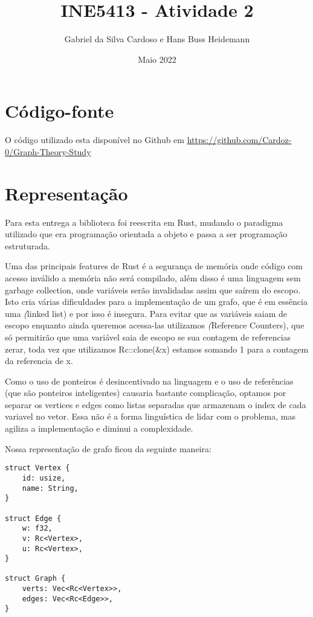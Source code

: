 \documentclass{article}
\title{INE5413 - Atividade 2}
\author{Gabriel da Silva Cardoso e Hans Buss Heidemann}
\date{Maio 2022}
\begin{document}
\maketitle

\section{Código-fonte}

O código utilizado esta disponível no Github em  \url{https://github.com/Cardoz-0/Graph-Theory-Study}

\section{Representação}
Para esta entrega a biblioteca foi reescrita em Rust, mudando o paradigma utilizado que era programação orientada a objeto e passa a ser programação estruturada.

Uma das principais features de Rust é a segurança de memória onde código com acesso inválido a memória não será compilado, além disso é uma linguagem sem garbage collection,
onde variáveis serão invalidadas assim que saírem do escopo. Isto cria várias dificuldades para a implementação de um grafo, que é em essência
uma \textit(linked list) e por isso é insegura. Para evitar que as variáveis saiam de escopo enquanto ainda queremos acessa-las utilizamos \textit(Reference Counters), que só permitirão
que uma variável saia de escopo se sua contagem de referencias zerar, toda vez que utilizamos Rc::clone(\&x) estamos somando 1 para a contagem da referencia de x.

Como o uso de ponteiros é desincentivado na linguagem e o uso de referências (que são ponteiros inteligentes) causaria bastante complicação, optamos por separar os vertices e edges como listas separadas que armazenam o
index de cada variavel no vetor. Essa não é a forma linguística de lidar com o problema, mas agiliza a implementação e diminui a complexidade.

Nossa representação de grafo ficou da seguinte maneira:

\begin{verbatim}
struct Vertex {
    id: usize,
    name: String,
}

struct Edge {
    w: f32,
    v: Rc<Vertex>,
    u: Rc<Vertex>,
}

struct Graph {
    verts: Vec<Rc<Vertex>>,
    edges: Vec<Rc<Edge>>,
}

\end{verbatim}
\end{document}
